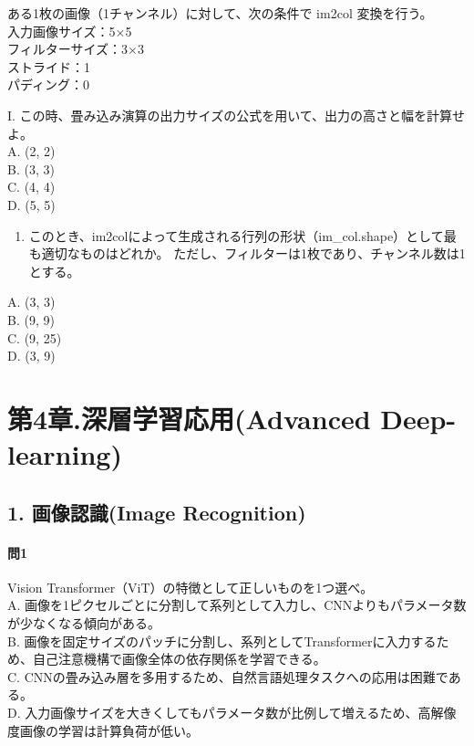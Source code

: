 \documentclass[
  letterpaper,
  DIV=11,
  numbers=noendperiod]{scrreprt}
\providecommand{\tightlist}{%
  \setlength{\itemsep}{0pt}\setlength{\parskip}{0pt}}
\begin{document}
ある1枚の画像（1チャンネル）に対して、次の条件で im2col 変換を行う。\\
入力画像サイズ：5×5\\
フィルターサイズ：3×3\\
ストライド：1\\
パディング：0

I.
この時、畳み込み演算の出力サイズの公式を用いて、出力の高さと幅を計算せよ。\\
A. (2, 2)\\
B. (3, 3)\\
C. (4, 4)\\
D. (5, 5)

\begin{enumerate}
\def\labelenumi{\Roman{enumi}.}
\setcounter{enumi}{1}
\tightlist
\item
  このとき、im2colによって生成される行列の形状（im\_col.shape）として最も適切なものはどれか。
  ただし、フィルターは1枚であり、チャンネル数は1とする。
\end{enumerate}

A. (3, 3)\\
B. (9, 9)\\
C. (9, 25)\\
D. (3, 9)

\part{第4章.深層学習応用(Advanced Deep-learning)}

\chapter{1. 画像認識(Image
Recognition)}\label{ux753bux50cfux8a8dux8b58image-recognition}

\subsection{問1}\label{ux554f1-2}

Vision Transformer（ViT）の特徴として正しいものを1つ選べ。\\
A.
画像を1ピクセルごとに分割して系列として入力し、CNNよりもパラメータ数が少なくなる傾向がある。\\
B.
画像を固定サイズのパッチに分割し、系列としてTransformerに入力するため、自己注意機構で画像全体の依存関係を学習できる。\\
C.
CNNの畳み込み層を多用するため、自然言語処理タスクへの応用は困難である。\\
D.
入力画像サイズを大きくしてもパラメータ数が比例して増えるため、高解像度画像の学習は計算負荷が低い。
\end{document}
